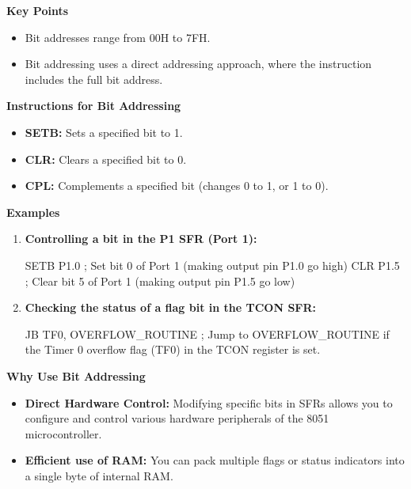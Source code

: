 \documentclass[
]{article}
\newenvironment{Shaded}{}{}
\newcommand{\NormalTok}[1]{#1}
\begin{document}
\textbf{Key Points}

\begin{itemize}
\item
  Bit addresses range from 00H to 7FH.
\item
  Bit addressing uses a direct addressing approach, where the
  instruction includes the full bit address.
\end{itemize}

\textbf{Instructions for Bit Addressing}

\begin{itemize}
\item
  \textbf{SETB:} Sets a specified bit to 1.
\item
  \textbf{CLR:} Clears a specified bit to 0.
\item
  \textbf{CPL:} Complements a specified bit (changes 0 to 1, or 1 to 0).
\end{itemize}

\textbf{Examples}

\begin{enumerate}
\def\labelenumi{\arabic{enumi}.}
\item
  \textbf{Controlling a bit in the P1 SFR (Port 1):}

\begin{Shaded}
\begin{Highlighting}[]
\NormalTok{SETB P1.0  ; Set bit 0 of Port 1 (making output pin P1.0 go high)}
\NormalTok{CLR P1.5   ; Clear bit 5 of Port 1 (making output pin P1.5 go low)}
\end{Highlighting}
\end{Shaded}
\item
  \textbf{Checking the status of a flag bit in the TCON SFR:}

\begin{Shaded}
\begin{Highlighting}[]
\NormalTok{JB TF0, OVERFLOW\_ROUTINE  ; Jump to \textquotesingle{}OVERFLOW\_ROUTINE\textquotesingle{} if the Timer 0 overflow flag (TF0) in the TCON register is set.}
\end{Highlighting}
\end{Shaded}
\end{enumerate}

\textbf{Why Use Bit Addressing}

\begin{itemize}
\item
  \textbf{Direct Hardware Control:} Modifying specific bits in SFRs
  allows you to configure and control various hardware peripherals of
  the 8051 microcontroller.
\item
  \textbf{Efficient use of RAM:} You can pack multiple flags or status
  indicators into a single byte of internal RAM.
\end{itemize}
\end{document}
